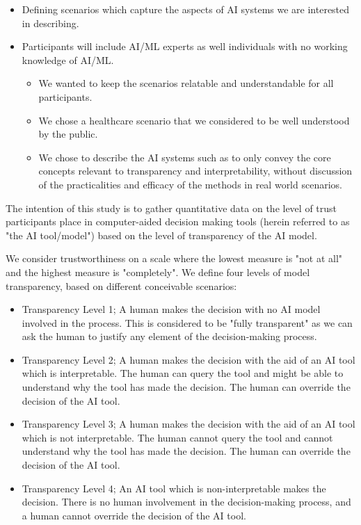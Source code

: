 \documentclass[manuscript,screen,review]{acmart}
\begin{document}
\begin{itemize}
\item Defining scenarios which capture the aspects of AI systems we are interested in describing.
\end{itemize}
\begin{itemize}
\item Participants will include AI/ML experts as well individuals with no working knowledge of AI/ML. 
\begin{itemize}
\item We wanted to keep the scenarios relatable and understandable for all participants. 
\item We chose a healthcare scenario that we considered to be well understood by the public.
\item We chose to describe the AI systems such as to only convey the core concepts relevant to transparency and interpretability, without discussion of the practicalities and efficacy of the methods in real world scenarios. 
\end{itemize}
\end{itemize}


The intention of this study is to gather quantitative data on the level of trust participants place in computer-aided decision making tools (herein referred to as "the AI tool/model") based on the level of transparency of the AI model.

We consider trustworthiness on a scale where the lowest measure is "not at all" and the highest measure is "completely". We define four levels of model transparency, based on different conceivable scenarios:
\begin{itemize}
    \item Transparency Level 1; A human makes the decision with no AI model involved in the process. This is considered to be "fully transparent" as we can ask the human to justify any element of the decision-making process.
    \item Transparency Level 2; A human makes the decision with the aid of an AI tool which is interpretable. The human can query the tool and might be able to understand why the tool has made the decision. The human can override the decision of the AI tool.
    \item Transparency Level 3; A human makes the decision with the aid of an AI tool which is not interpretable. The human cannot query the tool and cannot understand why the tool has made the decision. The human can override the decision of the AI tool. 
    \item Transparency Level 4; An AI tool which is non-interpretable makes the decision. There is no human involvement in the decision-making process, and a human cannot override the decision of the AI tool. 
\end{itemize}
\end{document}
